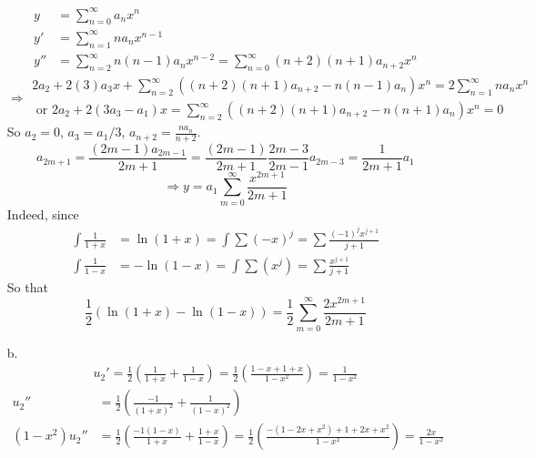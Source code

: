 \documentclass[twoside]{amsart}
\theoremstyle{plain}
\theoremstyle{definition}
\begin{document}
\begin{itemize}
\[
\begin{aligned}
  y & = \sum_{n=0}^{\infty} a_n x^n \\
  y' & = \sum_{n=1}^{\infty} na_n x^{n-1} \\ 
  y'' & = \sum_{n=2}^{\infty} n (n-1) a_n x^{n-2} = \sum_{n=0}^{\infty} (n+2)(n+1)a_{n+2}x^n 
\end{aligned}
\]
\[
\Longrightarrow
\begin{gathered}
  2a_2 + 2(3) a_3x + \sum_{n=2}^{\infty} ((n+2)(n+1) a_{n+2} - n(n-1)a_n) x^n = 2 \sum_{n=1}^{\infty} n a_n x^n \\ 
  \text{ or } 2a_2 + 2 (3a_3 - a_1) x = \sum_{n=2}^{\infty} ((n+2)(n+1) a_{n+2} - n(n+1)a_n) x^n = 0 
\end{gathered}
\]
So $a_2=0$, $a_3 = a_1/3$, $a_{n+2} = \frac{na_n}{n+2}$.  
\[
a_{2m+1} = \frac{(2m-1)a_{2m-1} }{2m+1} = \frac{ (2m-1)}{2m+1} \frac{2m-3}{2m-1} a_{2m-3} = \frac{1}{2m+1} a_1 
\]
\[
\Longrightarrow \boxed{ y = a_1 \sum_{m=0}^{\infty} \frac{x^{2m+1}}{2m+1} }
\]
Indeed, since 
\[
\begin{aligned}
  \int \frac{1}{1+x} & = \ln{(1+x)} = \int \sum (-x)^j = \sum \frac{(-1)^j x^{j+1} }{ j+1} \\
  \int \frac{1}{1-x} & = - \ln{ (1-x)} = \int \sum (x^j) = \sum \frac{ x^{j+1}}{ j+1}
\end{aligned}
\]
So that
\[
\frac{1}{2} ( \ln{(1+x)} - \ln{(1-x)} ) = \frac{1}{2} \sum_{m=0}^{\infty} \frac{2x^{2m+1} }{ 2m+1} 
\]
\item[b.] 
\[
\begin{aligned}
  u_2'  = \frac{1}{2} \left( \frac{1}{1+x} + \frac{1}{1-x} \right) = \frac{1}{2} \left( \frac{ 1 - x + 1 + x}{1-x^2} \right) = \frac{1}{1-x^2} 
\end{aligned}
\]
\[
\begin{aligned}
  u_2'' & = \frac{1}{2} \left( \frac{-1}{ (1+x)^2} + \frac{1}{ (1-x)^2} \right) \\ 
  (1-x^2) u_2'' & = \frac{1}{2} \left( \frac{-1(1-x)}{1+x} + \frac{1+x}{1-x} \right) = \frac{1}{2} \left( \frac{ -(1-2x + x^2) + 1 + 2x + x^2  }{ 1-x^2} \right) = \frac{2x}{1-x^2}
\end{aligned}
\]
\end{itemize}
\end{document}
